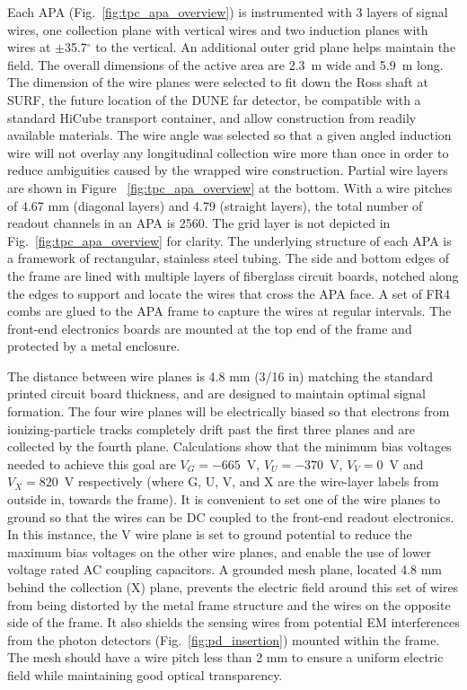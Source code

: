 Each APA (Fig.~\ref{fig:tpc_apa_overview}) is instrumented with 3 layers of signal wires, one collection plane with vertical wires and two 
induction planes with wires at $\pm$35.7$^\circ$ to the vertical.
An additional outer grid plane helps maintain the field. 
The overall dimensions of the active area are 2.3~m wide and 5.9~m long. The dimension of the wire planes were selected to fit down the Ross shaft at SURF, the future location of the DUNE far detector, be compatible with a standard HiCube transport container, and allow construction from readily available materials.  The wire angle was selected so that a given angled induction wire will not overlay any longitudinal collection wire more than once in order to reduce ambiguities caused by the wrapped wire construction. Partial wire layers are shown in 
Figure ~\ref{fig:tpc_apa_overview} at the bottom.  With a wire pitches of 4.67 mm (diagonal layers) and 4.79 (straight layers), the total number of readout channels in an APA is 2560.
The grid layer is not depicted in Fig.~\ref{fig:tpc_apa_overview} for clarity. The underlying structure of each APA is a framework of rectangular, stainless steel tubing.  The side and bottom edges of the frame are lined with multiple layers of fiberglass circuit boards, notched along the edges to support and locate the wires that cross the APA face. A set of FR4 combs are glued to the APA frame to capture the wires at regular intervals. The front-end electronics boards are mounted at the top end of the frame and protected by a metal enclosure. 


The distance between wire planes is 4.8 mm (3/16 in) matching the standard printed circuit board thickness, and are designed to maintain optimal signal formation. The four wire planes will be electrically biased so that electrons from ionizing-particle tracks completely drift past the first three planes and are collected by the fourth plane. Calculations show that the minimum bias voltages needed to achieve this goal are ${V_G = -665}$~V, ${V_U = -370}$~V, ${V_V = 0}$~V and ${V_X = 820 }$~V respectively (where G, U, V, and X are the wire-layer labels from outside in, towards the frame).  It is convenient to set one of the wire planes to ground so that the wires can be DC coupled to the front-end readout electronics. In this instance, the V wire plane is set to ground potential to reduce the maximum bias voltages on the other wire planes, and enable the use of lower voltage rated AC coupling capacitors. A grounded mesh plane, located 4.8 mm behind the collection (X) plane, prevents the electric field around this set of wires from being distorted by the metal frame structure and the wires on the opposite side of the frame. It also shields the sensing wires from potential EM interferences from the photon detectors (Fig.~\ref{fig:pd_insertion}) mounted within the frame. The mesh should have a wire pitch less than 2 mm to ensure a uniform electric field while maintaining good optical transparency.


